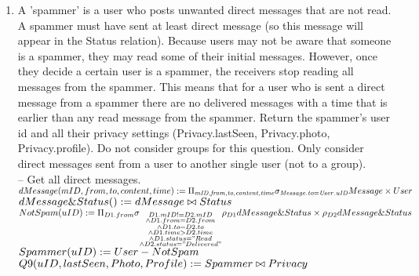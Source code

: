 \documentclass{article}
\newcommand{\var}[1]{\mathit{#1}}
\begin{document}
\begin{enumerate}
{}

\item   %
A 'spammer' is a user who posts unwanted direct messages that are not read. A spammer must have
sent at least direct message (so this message will appear in the Status relation). Because users may not
be aware that someone is a spammer, they may read some of their initial messages. However, once they
decide a certain user is a spammer, the receivers stop reading all messages from the spammer. This
means that for a user who is sent a direct message from a spammer there are no delivered messages
with a time that is earlier than any read message from the spammer. Return the spammer's user id
and all their privacy settings (Privacy.lastSeen, Privacy.photo, Privacy.profile).
Do not consider groups for this question. Only consider direct messages sent from a user to another
single user (not to a group). \\ [5pt]
\large{
\hspace*{1cm} -- Get all direct messages. \\ [5pt]
$
dMessage(mID, from, to, content, time) := \Pi_{\var{mID}, \var{from}, \var{to}, \var{content}, \var{time}} \\
\sigma_{\var{Message.to} = \var{User.uID}} Message \times User \\ [5pt]
$
$dMessage\&Status() := dMessage \bowtie Status \\[5pt]
$
$
NotSpam(uID) := \Pi_{D1.from} \sigma_{\substack{D1.mID != D2.mID \\
																\wedge D1.from = D2.from \\
																\wedge D1.to = D2.to \\
																\wedge D1.time > D2.time \\
																\wedge D1.status = "Read \\
																\wedge D2.status = "Delivered"}}
																\rho_{D1} dMessage\&Status \times \\
																\rho_{D2} dMessage\&Status \\ [5pt]
$
$
Spammer(uID) := User - NotSpam\\ [5pt]
$
$
Q9(uID, lastSeen, Photo, Profile) := Spammer \bowtie Privacy \\ [5pt]													
$
}


\end{enumerate}



\end{document}
